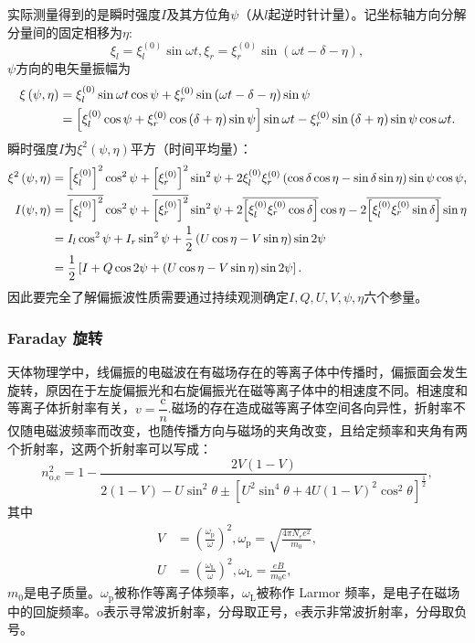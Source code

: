 \documentclass[../天体物理基础.tex]{subfiles}
\begin{document}
实际测量得到的是瞬时强度$I$及其方位角$\psi$（从$l$起逆时针计量）。记坐标轴方向分解分量间的固定相移为$\eta$:
\begin{equation}
\xi_l=\xi_l^{\left(0\right)}\sin\omega t,\xi_r=\xi_r^{\left(0\right)}\sin\left(\omega t-\delta-\eta\right),
\end{equation}
$\psi$方向的电矢量振幅为
\begin{align}
\xi\left(\psi,\eta\right)&=\xi_l^{\left(0\right)}\sin\omega t\cos\psi+\xi_r^{\left(0\right)}\sin\left(\omega t-\delta-\eta\right)\sin\psi\notag\\
&=\left[\xi_l^{\left(0\right)}\cos\psi+\xi_r^{\left(0\right)}\cos\left(\delta+\eta\right)\sin\psi\right]\sin\omega t-\xi_r^{\left(0\right)}\sin\left(\delta+\eta\right)\sin\psi\cos\omega t.
\end{align}
瞬时强度$I$为$\xi^{2}\left(\psi,\eta\right)$平方（时间平均量）：
\begin{align}
\xi^2\left(\psi,\eta\right)&=\left[\xi_l^{\left(0\right)}\right]^2\cos^2\psi+\left[\xi_r^{\left(0\right)}\right]^2\sin^2\psi+2\xi_l^{\left(0\right)}\xi_r^{\left(0\right)}\left(\cos\delta\cos\eta-\sin\delta\sin\eta\right)\sin\psi\cos\psi,\\
I(\psi,\eta)&=\overline{\left[\xi_l^{\left(0\right)}\right]^2}\cos^2\psi+\overline{\left[\xi_r^{\left(0\right)}\right]^2}\sin^2\psi+2\overline{\left[\xi_l^{\left(0\right)}\xi_r^{\left(0\right)}\cos\delta\right]}\cos\eta-2\overline{\left[\xi_l^{\left(0\right)}\xi_r^{\left(0\right)}\sin\delta\right]}\sin\eta\notag\\
&=I_l\cos^2\psi+I_r\sin^2\psi+\frac12\left(U\cos\eta-V\sin\eta\right)\sin2\psi\notag\\
&=\frac12\left[I+Q\cos2\psi+\left(U\cos\eta-V\sin\eta\right)\sin2\psi\right].
\end{align}
因此要完全了解偏振波性质需要通过持续观测确定$I,Q,U,V,\psi,\eta$六个参量。

\subsubsection{Faraday 旋转}
天体物理学中，线偏振的电磁波在有磁场存在的等离子体中传播时，偏振面会发生旋转，原因在于左旋偏振光和右旋偏振光在磁等离子体中的相速度不同。相速度和等离子体折射率有关，$v=\dfrac{\mathrm{c}}{n}$.磁场的存在造成磁等离子体空间各向异性，折射率不仅随电磁波频率而改变，也随传播方向与磁场的夹角改变，且给定频率和夹角有两个折射率，这两个折射率可以写成：
\begin{equation}
n^{2}_{\text{o,e}}=1-\frac{2V\left(1-V\right)}{2\left(1-V\right)-U\sin^{2}\theta\pm\left[U^{2}\sin^{4}\theta+4U\left(1-V\right)^{2}\cos^{2}\theta\right]^{\frac{1}{2}}},
\end{equation}
其中
\begin{align}
V&=\left(\frac{\omega_{\text{p}}}{\omega}\right)^{2},\omega_{\text{p}}=\sqrt{\frac{4\pi N_{e}e^{2}}{m_{0}}},\\
U&=\left(\frac{\omega_{\text{L}}}{\omega}\right)^{2},\omega_{\text{L}}=\frac{eB}{m_{0}\mathrm{c}},
\end{align}
$m_{0}$是电子质量。$\omega_{\text{p}}$被称作等离子体频率，$\omega_{\text{L}}$被称作 Larmor 频率，是电子在磁场中的回旋频率。$\text{o}$表示寻常波折射率，分母取正号，$\text{e}$表示非常波折射率，分母取负号。
\end{document}
